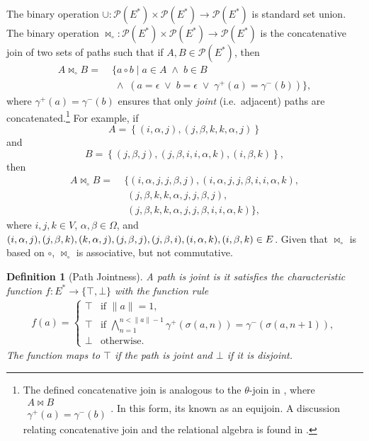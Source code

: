 \documentclass[10pt,conference,letterpaper]{IEEEtran}
\newcommand{\rar}{\rightarrow}
\newcommand{\mca}{\mathcal}
\newcommand{\join}{\bowtie_\circ}
\newtheorem{definition}{Definition}
\begin{document}
The binary operation $\cup: \mca{P}(E^*) \times \mca{P}(E^*) \rar \mca{P}(E^*)$ is standard set union. The binary operation $\join: \mca{P}(E^*) \times \mca{P}(E^*) \rar \mca{P}(E^*)$ is the concatenative join of two sets of paths such that if $A,B \in \mca{P}(E^*)$, then
\begin{align*}
A  \join B  = & \; \{ a \circ b \; | \; a \in A \; \wedge \; b \in B \\
		   & \;\; \wedge \; \left(a = \epsilon \; \vee \; b = \epsilon \; \vee \; \gamma^+(a) = \gamma^-(b) \right)\},
\end{align*}
where $\gamma^+(a) = \gamma^-(b)$ ensures that only \textit{joint} (i.e.~adjacent) paths are concatenated.\footnote{The defined concatenative join is analogous to the $\theta$-join in \cite{rdbms:codd1970}, where $\begin{array}{c}A \bowtie B \\ \gamma^+(a) = \gamma^-(b)\end{array}$. In this form, its known as an equijoin. A discussion relating concatenative join and the relational algebra is found in \cite{graph:pucheral1989}.} For example, if
\begin{equation*}
A = \left\{(i,\alpha,j),(j,\beta,k,k,\alpha,j) \right\}
\end{equation*}
and
\begin{equation*}
B = \left\{(j,\beta,j),(j,\beta,i,i,\alpha,k),(i,\beta,k)\right\},
\end{equation*}
then
\begin{align*}
A \join B =& \;  \{(i,\alpha,j,j,\beta,j),(i,\alpha,j,j,\beta,i,i,\alpha,k), \\
			 & \;\; (j,\beta,k,k,\alpha,j,j,\beta,j), \\
			 & \;\; (j,\beta,k,k,\alpha,j,j,\beta,i,i,\alpha,k) \},
\end{align*}
where $i,j,k \in V$, $\alpha,\beta \in \Omega$, and $(i,\alpha,j), (j,\beta,k), (k,\alpha,j), \\ (j,\beta,j), (j,\beta,i), (i,\alpha,k), (i,\beta,k) \in E$. Given that $\join$ is based on $\circ$, $\join$ is associative, but not commutative.
\begin{definition}[Path Jointness]
A path is joint is it satisfies the characteristic function $f: E^* \rar \{\top, \bot\}$ with the function rule
\begin{align*}
f(a) = 
	\begin{cases}
	  \top & \text{if } \|a\| = 1, \\
	  \top & \text{if } \bigwedge_{n=1}^{n<\|a\|-1} \gamma^+(\sigma(a,n)) = \gamma^-(\sigma(a,n+1)), \\
	  \bot & \text{otherwise}.
	\end{cases}
\end{align*}
The function maps to $\top$ if the path is joint and $\bot$ if it is disjoint.
\end{definition}
\end{document}
